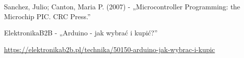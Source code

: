 \cleardoublepage
{}
{}
\begin{thebibliography}{999}
\begin{spacing}{1}
     Sanchez, Julio; Canton, Maria P. (2007) - „Microcontroller Programming: the Microchip PIC. CRC Press.”

     ElektronikaB2B - „Arduino - jak wybrać i kupić?”
    
    \url{https://elektronikab2b.pl/technika/50150-arduino-jak-wybrac-i-kupic}


    
\end{spacing}
\end{thebibliography}